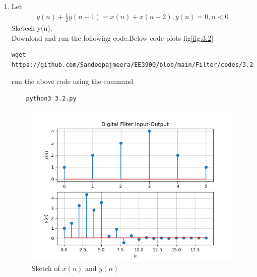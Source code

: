 \documentclass[journal,12pt,twocolumn]{IEEEtran}
\renewcommand\thesection{\arabic{section}}
\begin{document}
\begin{enumerate}[label=\thesection.\arabic*
,ref=\thesection.\theenumi]
\item Let
	\begin{align}\label{3.2}
		y(n) + \frac{1}{2}y(n-1) = x(n)+x(n-2),
		y(n)=0,n<0
	\end{align}
Sketech y(n).\\
\solution Download and run the following code.Below code plots fig\eqref{fig:3.2}
\begin{lstlisting}
wget https://github.com/Sandeepajmeera/EE3900/blob/main/Filter/codes/3.2.py
\end{lstlisting}
run the above code using the command
\begin{lstlisting}
	python3 3.2.py
\end{lstlisting}
\begin{figure}[h]
    \centering
    \includegraphics[width=\columnwidth]{./figs/3.2.png}
    \caption{Sketch of $x(n)$ and $y(n)$}
    \label{fig:3.2}
\end{figure}


\end{enumerate}
\end{document}
